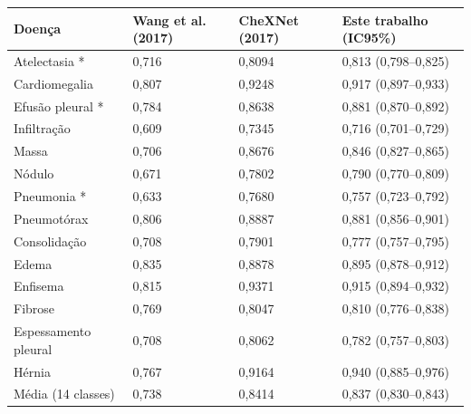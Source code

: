 \begin{tabular}{llll}
\toprule
Doença & Wang et al. (2017) & CheXNet (2017) & Este trabalho (IC95\%) \\
\midrule
Atelectasia * & 0,716 & 0,8094 & 0,813 (0,798–0,825) \\
Cardiomegalia & 0,807 & 0,9248 & 0,917 (0,897–0,933) \\
Efusão pleural * & 0,784 & 0,8638 & 0,881 (0,870–0,892) \\
Infiltração & 0,609 & 0,7345 & 0,716 (0,701–0,729) \\
Massa & 0,706 & 0,8676 & 0,846 (0,827–0,865) \\
Nódulo & 0,671 & 0,7802 & 0,790 (0,770–0,809) \\
Pneumonia * & 0,633 & 0,7680 & 0,757 (0,723–0,792) \\
Pneumotórax & 0,806 & 0,8887 & 0,881 (0,856–0,901) \\
Consolidação & 0,708 & 0,7901 & 0,777 (0,757–0,795) \\
Edema & 0,835 & 0,8878 & 0,895 (0,878–0,912) \\
Enfisema & 0,815 & 0,9371 & 0,915 (0,894–0,932) \\
Fibrose & 0,769 & 0,8047 & 0,810 (0,776–0,838) \\
Espessamento pleural & 0,708 & 0,8062 & 0,782 (0,757–0,803) \\
Hérnia & 0,767 & 0,9164 & 0,940 (0,885–0,976) \\
Média (14 classes) & 0,738 & 0,8414 & 0,837 (0,830–0,843) \\
\bottomrule
\end{tabular}

